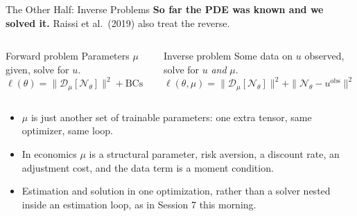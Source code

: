 \documentclass[aspectratio=169,11pt]{beamer}
\newcommand{\emphc}[1]{\textcolor{harvardcrimson}{#1}}
\begin{document}
\begin{frame}{The Other Half: Inverse Problems}
\textbf{So far the PDE was known and we solved it.} Raissi et al.\ (2019) also treat the reverse.

\vspace{0.4em}
\begin{columns}[T]
\begin{block}{Forward problem}
\small
Parameters $\mu$ given, solve for $u$.\\[4pt]
$\ell(\theta) = \|\mathcal{D}_\mu[\mathcal{N}_\theta]\|^2 + \text{BCs}$
\end{block}

\begin{alertblock}{Inverse problem}
\small
Some data on $u$ observed, solve for $u$ \emph{and} $\mu$.\\[4pt]
$\ell(\theta,\mu) = \|\mathcal{D}_\mu[\mathcal{N}_\theta]\|^2 + \|\mathcal{N}_\theta - u^{\text{obs}}\|^2$
\end{alertblock}
\end{columns}

\vspace{0.5em}
\begin{itemize}\setlength\itemsep{3pt}
    \item $\mu$ is just \emphc{another set of trainable parameters}: one extra tensor, same optimizer, same loop.
    \item In economics $\mu$ is a \emphc{structural parameter}, risk aversion, a discount rate, an adjustment cost, and the data term is a moment condition.
    \item Estimation and solution in \emphc{one} optimization, rather than a solver nested inside an estimation loop, as in Session 7 this morning.
\end{itemize}
\end{frame}
\end{document}
